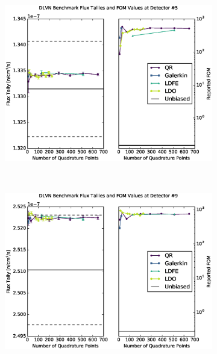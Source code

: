 \documentclass{article} %
\begin{document}
\begin{figure}[!htb]
\begin{subfigure}{\linewidth}
\centering
\includegraphics[max height=0.445\textheight]
{img/dlvn-fwcadis-5.eps}
\label{dlvn-fwc-5}
\end{subfigure} 
\\
\begin{subfigure}{\linewidth}
\centering
\includegraphics[max height=0.445\textheight]
{img/dlvn-fwcadis-9.eps}
\label{dlvn-fwc-9}
\end{subfigure}
\end{figure}
\end{document}
